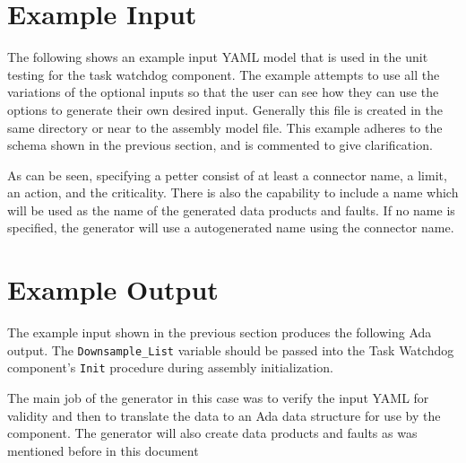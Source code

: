 
\section{Example Input}

The following shows an example input YAML model that is used in the unit testing for the task watchdog component. The example attempts to use all the variations of the optional inputs so that the user can see how they can use the options to generate their own desired input. Generally this file is created in the same directory or near to the assembly model file. This example adheres to the schema shown in the previous section, and is commented to give clarification.


As can be seen, specifying a petter consist of at least a connector name, a limit, an action, and the criticality. There is also the capability to include a name which will be used as the name of the generated data products and faults. If no name is specified, the generator will use a autogenerated name using the connector name. 

\section{Example Output}

The example input shown in the previous section produces the following Ada output. The \texttt{Downsample\_List} variable should be passed into the Task Watchdog component's \texttt{Init} procedure during assembly initialization.

The main job of the generator in this case was to verify the input YAML for validity and then to translate the data to an Ada data structure for use by the component. The generator will also create data products and faults as was mentioned before in this document



